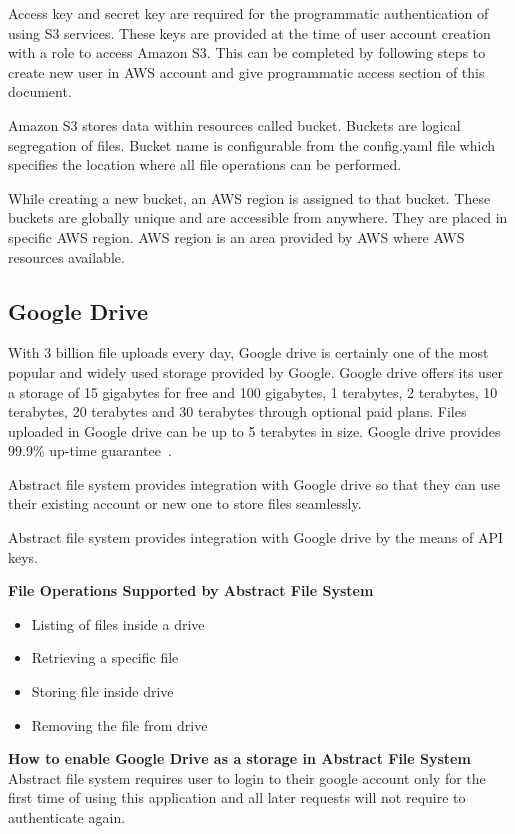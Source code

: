 Access key and secret key are required for the programmatic authentication of 
using S3 services. These keys are provided at the time of 
user account creation with a role to access Amazon S3.
This can be completed by following steps to create new user 
in AWS account and give programmatic access section of this document.

Amazon S3 stores data within resources called bucket. Buckets are logical
segregation of files. Bucket name is configurable from the config.yaml file
which specifies the location where all file operations can be performed.

While creating a new bucket, an AWS region is assigned to that bucket. These 
buckets are globally unique and are accessible from anywhere. They are
placed in specific AWS region. AWS region is an area provided by AWS where
AWS resources available.

\subsection{Google Drive}

With 3 billion file uploads every day, Google drive is certainly one of the 
most popular and widely used storage provided by Google. Google drive offers 
its user a storage of 15 gigabytes for free and 100 gigabytes, 1 terabytes, 2 
terabytes, 10 terabytes, 20 terabytes and 30 terabytes through optional paid 
plans. Files uploaded in Google drive can be up to 5 terabytes in size. Google 
drive provides 99.9\% up-time guarantee~\cite{hid-sp18-420-google-drive-wiki}. 

Abstract file system provides integration with Google drive so that they can 
use their existing account or new one to store files seamlessly.

Abstract file system provides integration with Google drive by the means of 
API keys. 

\textbf{File Operations Supported by Abstract File System }
\begin{itemize}
    \item  Listing of files inside a drive
    \item  Retrieving a specific file 
    \item  Storing file inside drive
    \item  Removing the file from drive
\end{itemize}

\textbf{How to enable Google Drive as a storage in Abstract File System}
\\
Abstract file system requires user to login to their google account only for 
the first time of using this application and all later requests will not 
require to authenticate again. 

